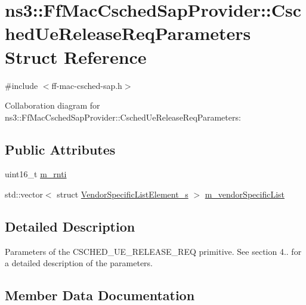 \hypertarget{structns3_1_1FfMacCschedSapProvider_1_1CschedUeReleaseReqParameters}{}\section{ns3\+:\+:Ff\+Mac\+Csched\+Sap\+Provider\+:\+:Csched\+Ue\+Release\+Req\+Parameters Struct Reference}
\label{structns3_1_1FfMacCschedSapProvider_1_1CschedUeReleaseReqParameters}


{\ttfamily \#include $<$ff-\/mac-\/csched-\/sap.\+h$>$}



Collaboration diagram for ns3\+:\+:Ff\+Mac\+Csched\+Sap\+Provider\+:\+:Csched\+Ue\+Release\+Req\+Parameters\+:
\subsection*{Public Attributes}
\begin{DoxyCompactItemize}
\item 
uint16\+\_\+t \hyperlink{structns3_1_1FfMacCschedSapProvider_1_1CschedUeReleaseReqParameters_abfec7e9bba6da8096a378c520d78207b}{m\+\_\+rnti}
\item 
std\+::vector$<$ struct \hyperlink{structns3_1_1VendorSpecificListElement__s}{Vendor\+Specific\+List\+Element\+\_\+s} $>$ \hyperlink{structns3_1_1FfMacCschedSapProvider_1_1CschedUeReleaseReqParameters_a750428ae95523671f3c14d195e8738a6}{m\+\_\+vendor\+Specific\+List}
\end{DoxyCompactItemize}


\subsection{Detailed Description}
Parameters of the C\+S\+C\+H\+E\+D\+\_\+\+U\+E\+\_\+\+R\+E\+L\+E\+A\+S\+E\+\_\+\+R\+EQ primitive. See section 4.. for a detailed description of the parameters. 

\subsection{Member Data Documentation}
